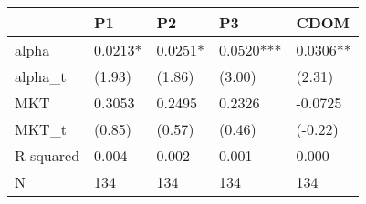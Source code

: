 \begin{tabular}{lllll}
\toprule
 & P1 & P2 & P3 & CDOM \\
\midrule
alpha & 0.0213* & 0.0251* & 0.0520*** & 0.0306** \\
alpha_t & (1.93) & (1.86) & (3.00) & (2.31) \\
MKT & 0.3053 & 0.2495 & 0.2326 & -0.0725 \\
MKT_t & (0.85) & (0.57) & (0.46) & (-0.22) \\
R-squared & 0.004 & 0.002 & 0.001 & 0.000 \\
N & 134 & 134 & 134 & 134 \\
\bottomrule
\end{tabular}
